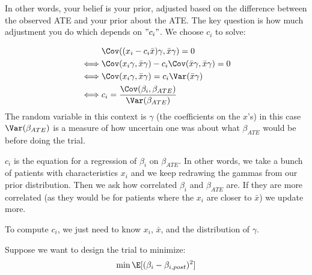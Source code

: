 \begin{enumerate}
\begin{enumerate}
				In other words, your belief is your prior, adjusted based on the difference between the observed ATE and your prior about the ATE.
				The key question is how much adjustment you do which depends on $"c_i"$. We choose $c_i$ to solve:

				\begin{align*}
                          & \Cov ((x_i - c_i \bar{x}) \gamma, \bar{x} \gamma) = 0                          \\
				 \iff     & \Cov(x_i \gamma, \bar{x} \gamma) -c_i \Cov(\bar{x} \gamma, \bar{x} \gamma) = 0 \\
					\iff  & \Cov(x_i \gamma, \bar{x} \gamma) = c_i \Var(\bar{x} \gamma)                  \\
				\iff & c_i = \frac{\Cov(\beta_i, \beta_{ATE}) }{ \Var(\beta_{ATE})}
				\end{align*} 
				The random variable in this context is $\gamma$ (the coefficients on the $x $'s) in this case $\Var(\beta_{ATE})$ is a measure of how uncertain one was about what $\beta_{ATE}$ would be before doing the trial.

				$c_i$ is the equation for a regression of $\beta_i$ on $\beta_{ATE}$. In other words, we take a bunch of patients with characteristics $x_i$ and we keep redrawing the gammas from our prior distribution. Then we ask how correlated  $\beta_i$ and $\beta_{ATE}$ are. If they are more correlated (as they would be for patients where the $x_i$ are closer to $\bar{x}$) we update more.

				To compute $c_i$, we just need to know $x_i$, $\bar{x}$, and the distribution of $\gamma$.

				Suppose we want to design the trial to minimize:
				\begin{align*}
					\min \E[(\beta_i - \beta_{i,post})^2]
				\end{align*} 
		\end{enumerate}

\end{enumerate} 







